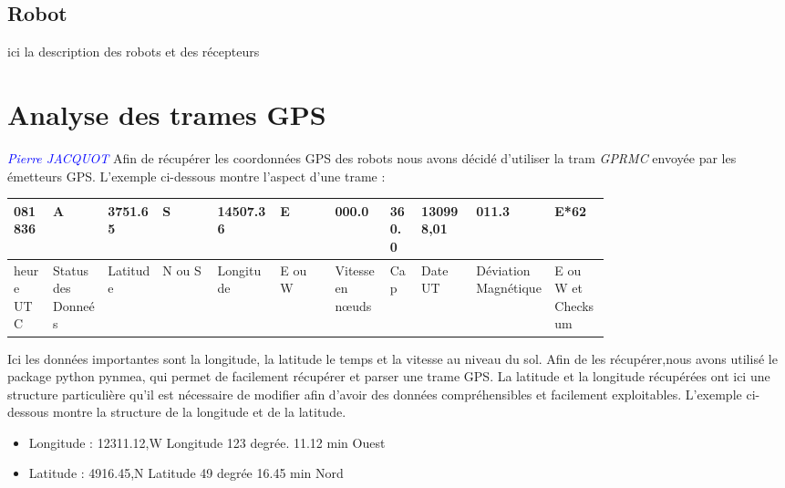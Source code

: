 \documentclass[10pt,a4paper]{report}
\begin{document}
\subsection{Robot}
ici la description des robots et des récepteurs
\section{Analyse des trames GPS}
\textcolor{blue}{\textit{Pierre JACQUOT}}
Afin de récupérer les coordonnées GPS des robots nous avons décidé d'utiliser la tram \textit{GPRMC} envoyée par les émetteurs GPS. L'exemple ci-dessous montre l'aspect d'une trame : \newline
\begin{center}
\begin{tabular}{|m{0.05\linewidth}|m{0.07\linewidth}|m{0.07\linewidth}|m{0.07\linewidth}|m{0.08\linewidth}|m{0.07\linewidth}|m{0.07\linewidth}|m{0.04\linewidth}|m{0.07\linewidth}|m{0.1\linewidth}|m{0.07\linewidth}|}
\hline
    081836 & A & 3751.65 & S & 14507.36 & E & 000.0 & 360.0 & 130998,01 & 011.3 & E*62  \\ \hline
    heure UTC & Status des Donneés & Latitude & N ou S & Longitude & E ou W & Vitesse en nœuds & Cap & Date UT & Déviation Magnétique & E ou W et Checksum \\ \hline

\end{tabular}
\end{center}
Ici les données importantes sont la longitude, la latitude le temps et la vitesse au niveau du sol. Afin de les récupérer,nous avons utilisé le package python pynmea, qui permet de facilement récupérer et parser une trame GPS. \newline
La latitude et la longitude récupérées ont ici une structure particulière qu'il est nécessaire de modifier afin d'avoir des données compréhensibles et facilement exploitables. L'exemple ci-dessous montre la structure de la longitude et de la latitude. \newline
\begin{itemize}
  \item Longitude  : 12311.12,W   Longitude 123 degrée. 11.12 min Ouest
  \item Latitude : 4916.45,N    Latitude 49 degrée 16.45 min Nord
\end{itemize}
\end{document}
